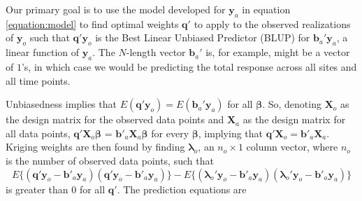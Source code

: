 \documentclass[]{interact}
\theoremstyle{plain}%
\theoremstyle{definition}
\theoremstyle{remark}
\begin{document}
Our primary goal is to use the model developed for \(\mathbf{y}_a\) in
equation \ref{equation:model} to find optimal weights \(\mathbf{q}'\) to
apply to the observed realizations of \(\mathbf{y}_o\) such that
\(\mathbf{q}' \mathbf{y}_o\) is the Best Linear Unbiased Predictor
(BLUP) for \(\mathbf{b}_a' \mathbf{y}_a\), a linear function of
\(\mathbf{y}_a\). The \(N\)-length vector \(\mathbf{b}_a'\) is, for
example, might be a vector of \(1\)'s, in which case we would be
predicting the total response across all sites and all time points.

Unbiasedness implies that
\(E(\mathbf{q'}\mathbf{y}_o) = E(\mathbf{b}_a'\mathbf{y}_a)\) for all
\(\bm{\beta}\). So, denoting \(\mathbf{X}_o\) as the design matrix for
the observed data points and \(\mathbf{X}_a\) as the design matrix for
all data points, \(\mathbf{q'} \mathbf{X}_o \bm{\beta}\) =
\(\mathbf{b'}_a \mathbf{X}_a \bm{\beta}\) for every \(\bm{\beta}\),
implying that \(\mathbf{q'} \mathbf{X}_o = \mathbf{b'}_a \mathbf{X}_a\).
Kriging weights are then found by finding \(\bm{\lambda}_o\), an
\(n_o \times 1\) column vector, where \(n_o\) is the number of observed
data points, such that \mbox{} \begin{equation}
E\{(\mathbf{q'}\mathbf{y}_o - \mathbf{b'}_a \mathbf{y}_a)(\mathbf{q'}\mathbf{y}_o - \mathbf{b'}_a \mathbf{y}_a)\} - E\{(\bm{\lambda}_o'\mathbf{y}_o - \mathbf{b'}_a \mathbf{y}_a)(\bm{\lambda}_o'\mathbf{y}_o - \mathbf{b'}_a \mathbf{y}_a)\}
\end{equation} \noindent is greater than 0 for all \(\mathbf{q'}\). The
prediction equations are
\end{document}
